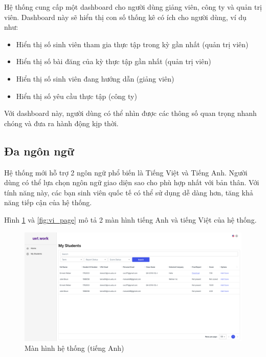 \documentclass[./../main.tex]{subfiles}
\begin{document}
Hệ thống cung cấp một dashboard cho người dùng giảng viên, công ty và
quản trị viên. Dashboard này sẽ hiển thị con số thống kê có ích cho
người dùng, ví dụ như:

\begin{itemize}
\item
  
  Hiển thị số sinh viên tham gia thực tập trong kỳ gần nhất (quản trị
  viên)
  
\item
  
  Hiển thị số bài đăng của kỳ thực tập gần nhất (quản trị viên)
  
\item
  
  Hiển thị số sinh viên đang hướng dẫn (giảng viên)
  
\item
  
  Hiển thị số yêu cầu thực tập (công ty)
  
\end{itemize}

Với dashboard này, người dùng có thể nhìn được các thông số quan trọng
nhanh chóng và đưa ra hành động kịp thời.

\hypertarget{ux111a-nguxf4n-ngux1eef-1}{%
\subsection{Đa ngôn ngữ}\label{ux111a-nguxf4n-ngux1eef-1}}

Hệ thống mới hỗ trợ 2 ngôn ngữ phổ biến là Tiếng Việt và Tiếng Anh.
Người dùng có thể lựa chọn ngôn ngữ giao diện sao cho phù hợp nhất với
bản thân. Với tính năng này, các bạn sinh viên quốc tế có thể sử dụng dễ
dàng hơn, tăng khả năng tiếp cận của hệ thống.

Hình \ref{fig:en_page} và \ref{fig:vi_page} mô tả 2 màn hình tiếng Anh và tiếng Việt của hệ thống.

\begin{figure}[]
	\includegraphics[width=\linewidth]{./images/image13.png}
	\caption{Màn hình hệ thống (tiếng Anh)}
	\label{fig:en_page}
\end{figure}
\end{document}
